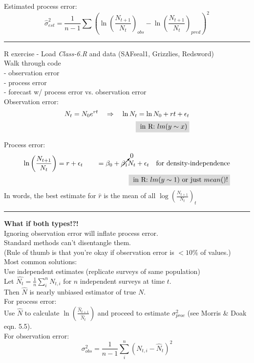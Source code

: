\documentclass{article}
\newcommand{\note}[1]{\colorbox{gray!30}{#1}}
\newcommand{\ind}{\-\hspace{1cm}}
\newcommand*\circled[1]{\tikz[baseline=(char.base)]{
            \node[shape=circle,draw,inner sep=2pt] (char) {#1};}}
\begin{document}
Estimated process error:
\begin{equation*}
	\hat{\sigma}_{est}^2 = \frac{1}{n-1}\sum \left(\ln\left(\frac{N_{t+1}}{N_t}\right)_{obs} - \ln\left(\frac{N_{t+1}}{N_t}\right)_{pred}\right)^2
\end{equation*}

\rule[0.5ex]{\linewidth}{1pt}

\pagebreak
\note{R exercise} - Load \emph{Class-6.R} and data (SAFseal1, Grizzlies, Redsword)\\
\ind \note{Walk through code}\\
\ind \ind - observation error\\
\ind \ind - process error\\
\ind \ind - forecast w/ process error vs. observation error\\

Observation error:
\begin{align*}
	N_t=N_0 e^{rt} \quad \Rightarrow \quad \ln{N_t}=\ln{N_0}+rt+\epsilon_t \\
	\note{ in R: $lm(y\sim x)$}
\end{align*}

Process error:
\begin{align*}
	\ln\left(\frac{N_{t+1}}{N_t}\right) = r + \epsilon_t \quad \quad = \beta_0 + \cancelto{0}{\beta_1} N_t + \epsilon_t \quad \text{for density-independence}\\
	\note{ in R: $lm(y\sim 1)$ or just $mean$()!}
\end{align*}
\ind In words, the best estimate for $\hat{r}$ is the mean of all $\log \left(\frac{N_{t+1}}{N_t}\right)_t$

\rule[0.5ex]{\linewidth}{1pt}
\textbf{What if both types!?!}\\
Ignoring observation error will inflate process error.\\
Standard methods can't disentangle them.\\
\ind (Rule of thumb is that you're okay if observation error is $<10\%$ of values.)\\

Most common solutions:\\

\circled{1} Use independent estimates (replicate surveys of same population)\\
Let $\hat{N_t} = \frac{1}{n}\sum_i^n N_{t,i}$ for $n$ independent surveys at time $t$.\\
\ind Then $\hat{N}$ is nearly unbiased estimator of true $N$.\\
For process error:\\
\ind Use $\hat{N}$ to calculate $\ln\left(\frac{\hat{N}_{t+1}}{\hat{N}_t}\right)$ and proceed to estimate $\sigma_{proc}^2$ (see Morris \& Doak eqn. 5.5).\\
For observation error:\\
\begin{equation*}
	\sigma_{obs}^2 = \frac{1}{n-1}\sum_i^n \left(N_{t,i}-\hat{N}_t\right)^2
\end{equation*}
\end{document}
